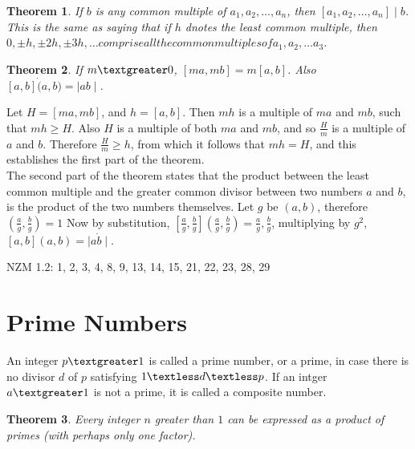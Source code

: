 \documentclass[11pt]{article} %
\newtheorem{theorem}{Theorem}[section]
\newenvironment{proof}[1][Proof]{\begin{trivlist}
\item[\hskip \labelsep {\bfseries #1}]}{\end{trivlist}}
\newenvironment{definition}[1][Definition]{\begin{trivlist}
\item[\hskip \labelsep {\bfseries #1}]}{\end{trivlist}}
\newenvironment{assignment}[1][Assignment]{\begin{trivlist}
\item[\hskip \labelsep {\bfseries #1}]}{\end{trivlist}}
\begin{document}
\begin{theorem}
	If $b$ is any common multiple of $a_1, a_2, \ldots, a_n$, then $[a_1, a_2, \ldots, a_n] \mid b$. This is the same as saying that if $h$ dnotes the least common multiple, then $0, \pm h, \pm 2h, \pm 3h, \ldots comprise all the common multiples of a_1, a_2, \ldots a_3$. 
\end{theorem}

\begin{theorem}
	If $ m \textgreater 0$, $[ma, mb] = m[a, b]$. Also $[a, b] \dot (a, b) = \mid ab \mid$.
\end{theorem}

\begin{proof}
	Let $H = [ma, mb]$, and $h = [a, b]$. Then $mh$ is a multiple of $ma$ and $mb$, such that $mh \ge H$. Also $H$ is a multiple of both $ma$ and $mb$, and so $\frac{H}{m}$ is a multiple of $a$ and $b$. Therefore $\frac{H}{m} \ge h$, from which it follows that $mh = H$, and this establishes the first part of the theorem. 
\\ The second part of the theorem states that the product between the least common multiple and the greater common divisor between two numbers $a$ and $b$, is the product of the two numbers themselves. Let $g$ be $(a, b)$, therefore $(\frac{a}{g}, \frac{b}{g}) = 1$ Now by substitution, $[\frac{a}{g}, \frac{b}{g}](\frac{a}{g}, \frac{b}{g}) = \frac{a}{g}, \frac{b}{g}$, multiplying by $g^2$, $[a,b](a,b) = \mid a \dot b \mid$.
\end{proof}

\begin{assignment}
	NZM 1.2: 1, 2, 3, 4, 8, 9, 13, 14, 15, 21, 22, 23, 28, 29
\end{assignment}

\section{Prime Numbers}

\begin{definition}
	An integer $p  \textgreater 1$ is called a prime number, or a prime, in case there is no divisor $d$ of $p$ satisfying $1 \textless d \textless p$. If an intger $a \textgreater 1$ is not a prime, it is called a composite number.
\end{definition}

\begin{theorem}
	Every integer $n$ greater than $1$ can be expressed as a product of primes (with perhaps only one factor). 
\end{theorem}
\end{document}
